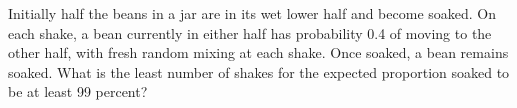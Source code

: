 Initially half the beans in a jar are in its wet lower half and become soaked. On each shake, a bean currently in either half has probability 0.4 of moving to the other half, with fresh random mixing at each shake. Once soaked, a bean remains soaked. What is the least number of shakes for the expected proportion soaked to be at least 99 percent?
